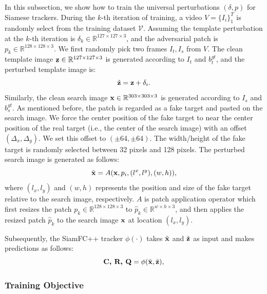 \documentclass{article}
\begin{document}
In this subsection, we show how to train the universal perturbations $(\delta, p)$ for Siamese trackers.
During the $k$-th iteration of training, a video $V=\{I_i\}_1^T$ is randomly select from the training dataset $\mathcal V$. Assuming the template perturbation at the $k$-th iteration is $\delta_k \in \mathbb{R}^{127\times 127 \times 3}$, and the adversarial patch is $p_k \in \mathbb{R}^{128\times 128\times 3}$. We first randomly pick two frames $I_t, I_s$ from $V$.
The clean template image $\textbf z\in \mathbb{R}^{127\times 127 \times 3}$ is generated according to $I_t$ and $b^{gt}_t$, and the perturbed template image is:
\begin{equation}
\tilde {\textbf z} = \textbf z + \delta_i.
\end{equation}
Similarly, the clean search image $\textbf x \in \mathbb{R}^{303\times 303 \times 3}$ is generated according to $I_s$ and $b^{gt}_s$.
As mentioned before, the patch is regarded as a fake target and pasted on the search image. We force the center position of the fake target to near the center position of the real target (i.e., the center of the search image) with an offset $(\Delta_x, \Delta_y)$. We set this offset to $(\pm 64, \pm 64)$. The width/height of the fake target is randomly selected between 32 pixels and 128 pixels.
The perturbed search image is generated as follows:
\begin{equation}
\tilde{\textbf x} = A(\textbf x, p_i, (l^x, l^y), (w, h)),
\end{equation}
where $(l_x, l_y)$ and $(w, h)$ represents the position and size of the fake target relative to the search image, respectively. $A$ is patch application operator \cite{patch} which first resizes the patch $p_k \in \mathbb{R}^{128\times 128\times 3}$ to $\hat{p}_k \in \mathbb{R}^{w\times h\times 3}$, and then applies the resized patch $\hat{p}_k$ to the search image $\textbf x$ at location $(l_x,l_y)$.

Subsequently, the SiamFC++ tracker $\phi(\cdot)$ takes $\tilde {\textbf x}$ and $\tilde{\textbf  z}$ as input and makes predictions as follows:
\begin{equation}
\textbf{C, R, Q} = \phi(\tilde {\textbf x}, \tilde{\textbf  z}),
\end{equation}

\subsubsection{Training Objective}
\end{document}
